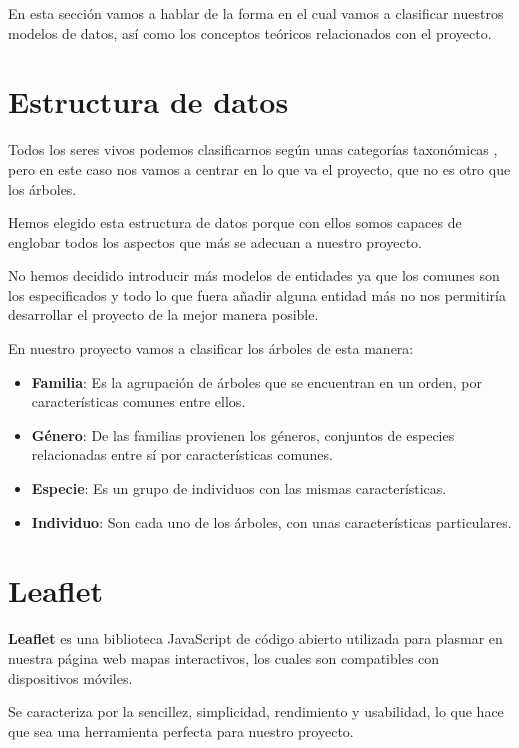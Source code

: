 
En esta sección vamos a hablar de la forma en el cual vamos a clasificar nuestros modelos de datos, así como los conceptos teóricos relacionados con el proyecto.

\section{Estructura de datos}

Todos los seres vivos podemos clasificarnos según unas categorías taxonómicas \cite{CategoriaTaxonomica}, pero en este caso nos vamos a centrar en lo que va el proyecto, que no es otro que los árboles.

Hemos elegido esta estructura de datos porque con ellos somos capaces de englobar todos los aspectos que más se adecuan a nuestro proyecto.

No hemos decidido introducir más modelos de entidades ya que los comunes son los especificados y todo lo que fuera añadir alguna entidad más no nos permitiría desarrollar el proyecto de la mejor manera posible.

En nuestro proyecto vamos a clasificar los árboles de esta manera:
\begin{itemize}
	\item \textbf{Familia}: Es la agrupación de árboles que se encuentran en un orden, por características comunes entre ellos.
	\item \textbf{Género}: De las familias provienen los géneros, conjuntos de especies relacionadas entre sí por características comunes.
	\item \textbf{Especie}: Es un grupo de individuos con las mismas características.
	\item \textbf{Individuo}: Son cada uno de los árboles, con unas características particulares.
\end{itemize}
\section{Leaflet}

\textbf{Leaflet} \cite{leaflet} es una biblioteca JavaScript de código abierto utilizada para plasmar en nuestra página web mapas interactivos, los cuales son compatibles con dispositivos móviles.

Se caracteriza por la sencillez, simplicidad, rendimiento y usabilidad, lo que hace que sea una herramienta perfecta para nuestro proyecto.

